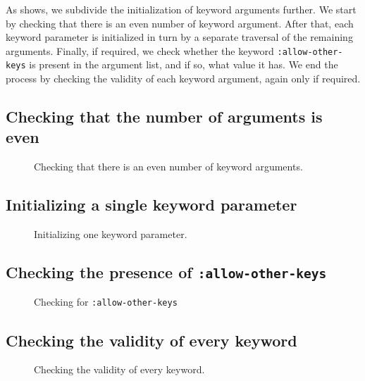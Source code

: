 As  shows, we subdivide the
initialization of keyword arguments further.  We start by checking
that there is an even number of keyword argument.  After that, each
keyword parameter is initialized in turn by a separate traversal of
the remaining arguments.  Finally, if required, we check whether the
keyword \texttt{:allow-other-keys} is present in the argument list,
and if so, what value it has.  We end the process by checking the
validity of each keyword argument, again only if required.

\subsection{Checking that the number of arguments is even}

\begin{figure}
\begin{center}
\end{center}
\caption{\label{fig-check-even-keyword-arguments}
Checking that there is an even number of keyword arguments.}
\end{figure}

\subsection{Initializing a single keyword parameter}

\begin{figure}
\begin{center}
\end{center}
\caption{\label{fig-initialize-one-keyword-parameter}
Initializing one keyword parameter.}
\end{figure}

\subsection{Checking the presence of \texttt{:allow-other-keys}}

\begin{figure}
\begin{center}
\end{center}
\caption{\label{fig-check-allow-other-keys}
Checking for \texttt{:allow-other-keys}}
\end{figure}

\subsection{Checking the validity of every keyword}

\begin{figure}
\begin{center}
\end{center}
\caption{\label{fig-check-every-keyword}
Checking the validity of every keyword.}
\end{figure}
